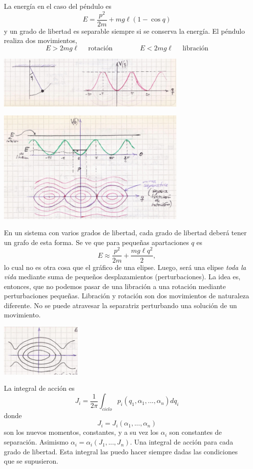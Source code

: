 \documentclass[10pt,oneside]{CBFT_book}
\begin{document}
La energía en el caso del péndulo es
\[
	E = \frac{p^2}{2m} + m g \ell ( 1 - \cos q )
\]
y un grado de libertad es separable siempre si se conserva la energía.
El péndulo realiza dos movimientos,
\[
	E > 2mg\ell \quad \text{ rotación} \qquad \qquad E < 2mg\ell \quad \text{ libración}
\]

\includegraphics[width=0.7\textwidth]{images/fig_mc_pendulo_angacc1.jpg}

\includegraphics[width=0.7\textwidth]{images/fig_mc_pendulo_angacc2.jpg}

En un sistema con varios grados de libertad, cada grado de libertad deberá tener un grafo de
esta forma.
Se ve que para pequeñas apartaciones $q$ es
\[
	E \approx \frac{p^2}{2m} + \frac{ m g \ell q^2 }{2},
\]
lo cual no es otra cosa que el gráfico de una elipse. Luego, será una elipse {\it toda la vida} mediante
suma de pequeños desplazamientos (perturbaciones). La idea es, entonces, que no podemos pasar de una
libración a una rotación mediante perturbaciones pequeñas. 
Libración y rotación son dos movimientos de naturaleza diferente.
No se puede atravesar la separatriz perturbando una solución de un movimiento.

\includegraphics[width=0.3\textwidth]{images/fig_mc_pendulo_angacc3.jpg}

La integral de acción es
\[
	J_i = \frac{1}{2\pi}\int_{ciclo} p_i(q_1,\alpha_1,...,\alpha_n) dq_i
\]
donde 
\[
	J_i = J_i(\alpha_1,...,\alpha_n)
\]
son los nuevos momentos, constantes, y a su vez los $\alpha_i$ son constantes de separación.
Asimismo $\alpha_i=\alpha_i(J_1,...,J_n)$. Una integral de acción para cada grado de libertad.
Esta integral las puedo hacer siempre dadas las condiciones que se supusieron.
\end{document}
